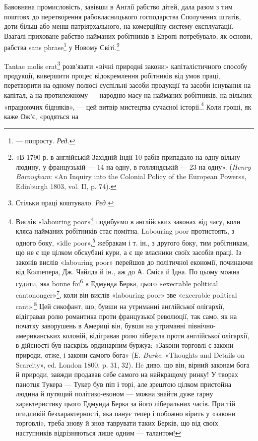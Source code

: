 Бавовняна промисловість, завівши в Англії рабство дітей,
дала разом з тим поштовх до перетворення рабовласницького
господарства Сполучених штатів, доти більш або менш патріярхального,
на комерційну систему експлуатації. Взагалі приховане
рабство найманих робітників в Европі потребувало, як основи,
рабства sans phrase\footnote*{
— попросту. \emph{Ред.}
} у Новому Світі.\footnote{
«В 1790 р. в англійській Західній Індії 10 рабів припадало на
одну вільну людину, у французькій — 14 на одну, в голляндській — 23
на одну». (\emph{Henry Barougham}: «An Inquiry into the Colonial Policy of
the European Powers», Edinburgh 1803, vol. II, p. 74).
}

Tantae molis erat\footnote*{
Стільки праці коштувало. \emph{Ред.}
} розв’язати «вічні природні закони»
капіталістичного способу продукції, вивершити процес відокремлення
робітників від умов праці, перетворити на одному
полюсі суспільні засоби продукції та засоби існування на капітал,
а на протилежному — народню масу на найманих робітників,
на вільних «працюючих бідняків», — цей витвір мистецтва
сучасної історії.\footnote{
Вислів «labouring poor»\footnote*{
— працюючі бідняки. \emph{Ред.}
} подибуємо в англійських законах від
часу, коли кляса найманих робітників стає помітна. Labouring poor протистоять,
з одного боку, «idle poor»,\footnote*{
— біднякам-неробам. \emph{Ред.}
} жебракам і т. ін., з другого боку,
тим робітникам, що не є ще цілком обскубані кури, а є ще власники
своїх засобів праці. Із законів вислів «labouring poor» перейшов
до політичної економії, починаючи від Колпепера, Дж. Чайлда й ін.,
аж до А. Сміса й Ідна. По цьому можна судити, яка bonne foi\footnote*{
— сумлінність. \emph{Ред.}
} в Едмунда
Берка, цього «execrable political cantononger»\footnote*{
— огидливого політичного крамаря. \emph{Ред.}
}, коли він вислів
«labouring poor» зве «execrable political cant».\footnote*{
— огидливим політичним перекрученням. \emph{Ред.}
} Цей сикофант, що,
бувши на утриманні англійської олігархії, відігравав ролю романтика проти
французької революції, так само, як на початку заворушень в Америці
він, бувши на утриманні північно-американських колоній, відігравав
ролю ліберала проти англійської олігархії, в дійсності був наскрізь ординарним
буржуа: «Закони торговлі є закони природи, отже, і закони самого
бога» (\emph{Е. Burke}: «Thoughts and Details on Scarcity», ed. London
1800, p. 31, 32). He диво, що він, вірний законам бога й природи, завжди
продавав себе самого на найкращому ринку! У творах панотця Тукера —
Тукер був піп і торі, але зрештою цілком пристойна людина й путящий
політико-економ — можна знайти дуже гарну характеристику цього
Едмунда Берка за його ліберальних часів. При тій огидливій безхарактерності,
яка панує тепер і побожно вірить у «закони торговлі», треба
знову й знов таврувати таких Берків, що від своїх наступників відрізняються
лише одним — талантом!
} Коли гроші, як каже Ож’є, «родяться на

